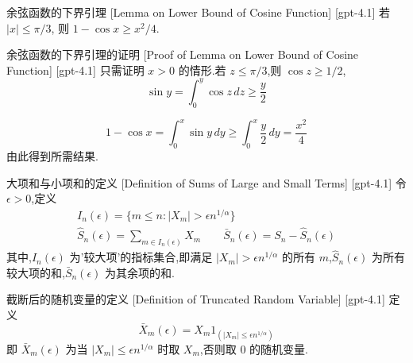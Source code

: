 \documentclass[UTF8]{ctexart}
\begin{document}
    
    
    \begin{lma}
        {余弦函数的下界引理}
        [Lemma on Lower Bound of Cosine Function]
        [gpt-4.1]
        若 $|x| \le \pi/3$, 则 $1 - \cos x \geq x^2 / 4$.
    \end{lma}
    
    
    
    \begin{prf}
        {余弦函数的下界引理的证明}
        [Proof of Lemma on Lower Bound of Cosine Function]
        [gpt-4.1]
        只需证明 $x > 0$ 的情形.若 $z \le \pi / 3$,则 $\cos z \ge 1/2$,
\[
\sin y = \int_0^y \cos z \, dz \geq \frac{y}{2}
\]

\[
1 - \cos x = \int_0^x \sin y \, dy \geq \int_0^x \frac{y}{2} \, dy = \frac{x^2}{4}
\]
由此得到所需结果.
    \end{prf}
    
    
    
    \begin{dfn}
        {大项和与小项和的定义}
        [Definition of Sums of Large and Small Terms]
        [gpt-4.1]
        令 $\epsilon > 0$,定义
\[
\begin{array}{l}
\displaystyle I_n ( \epsilon ) = \{ m \leq n : | X_m | > \epsilon n^{1/\alpha} \} \\
\displaystyle \hat{S}_n ( \epsilon ) = \sum_{m \in I_n ( \epsilon )} X_m \qquad \bar{S}_n ( \epsilon ) = S_n - \hat{S}_n ( \epsilon )
\end{array}
\]
其中,$I_n ( \epsilon )$ 为'较大项'的指标集合,即满足 $|X_m| > \epsilon n^{1/\alpha}$ 的所有 $m$,$\hat{S}_n ( \epsilon )$ 为所有较大项的和,$\bar{S}_n ( \epsilon )$ 为其余项的和.

    \end{dfn}
    
    
    
    \begin{dfn}
        {截断后的随机变量的定义}
        [Definition of Truncated Random Variable]
        [gpt-4.1]
        定义
\[
\bar{X}_m ( \epsilon ) = X_m 1_{ ( | X_m | \leq \epsilon n^{1/\alpha} ) }
\]
即 $\bar{X}_m ( \epsilon )$ 为当 $| X_m | \leq \epsilon n^{1/\alpha}$ 时取 $X_m$,否则取 $0$ 的随机变量.

    \end{dfn}
    
\end{document}
